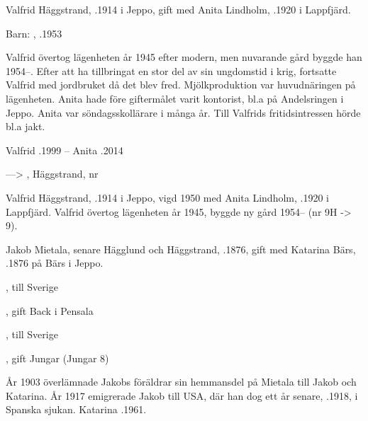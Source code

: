 Valfrid Häggstrand, .1914 i Jeppo, gift med Anita Lindholm, .1920 i Lappfjärd.

Barn: , .1953

Valfrid övertog lägenheten år 1945 efter modern, men nuvarande gård byggde han 1954--. Efter att ha tillbringat en stor del av sin ungdomstid i krig, fortsatte Valfrid med jordbruket då det blev fred. Mjölkproduktion var huvudnäringen på lägenheten. Anita hade före giftermålet varit kontorist, bl.a på Andelsringen i Jeppo. Anita var söndagsskollärare i många år. Till Valfrids fritidsintressen hörde bl.a jakt.

Valfrid .1999  --  Anita .2014


---> , Häggstrand, nr 

Valfrid Häggstrand, .1914 i Jeppo, vigd 1950 med Anita Lindholm, .1920 i Lappfjärd. Valfrid övertog lägenheten år 1945, byggde ny gård 1954-- (nr 9H -> 9).


Jakob Mietala, senare Hägglund och Häggstrand, .1876, gift med Katarina Bärs, .1876 på Bärs i Jeppo.
\begin{jhchildren}
  \item {}
  \item {}, till Sverige
  \item {}
  \item {}, gift Back i Pensala
  \item {}, till Sverige
  \item {}, gift Jungar (Jungar 8)
  \item {}
  \item {}
\end{jhchildren}
År 1903 överlämnade Jakobs föräldrar sin hemmansdel på Mietala till Jakob och Katarina. År 1917 emigrerade Jakob till USA, där han dog ett år senare, .1918, i Spanska sjukan. Katarina .1961.


